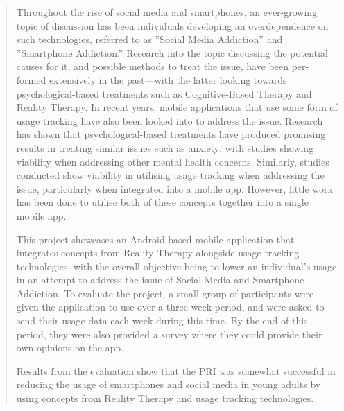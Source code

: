 \documentclass[12pt]{article}
\begin{document}
\begin{abstract}
Throughout the rise of social media and smartphones, an ever-growing topic of discussion has been individuals developing an overdependence on such technologies, referred to as ”Social Media 
Addiction” and ”Smartphone Addiction.” Research into the topic discussing the potential causes for it, and possible methods to treat the issue, have been per- formed extensively in the 
past—with the latter looking towards psychological-based treatments such as Cognitive-Based Therapy and Reality Therapy. In recent years, mobile applications that use some form of usage tracking 
have also been looked into to address the issue. Research has shown that psychological-based treatments have produced promising results in treating similar issues such as anxiety; with studies 
showing viability when addressing other mental health concerns. Similarly, studies conducted show viability in utilising usage tracking when addressing the issue, particularly when integrated 
into a mobile app. However, little work has been done to utilise both of these concepts together into a single mobile app.\newline


This project showcases an Android-based mobile application that integrates concepts from Reality Therapy alongside usage tracking technologies, with
the overall objective being to lower an individual's usage in an attempt to address the issue of Social Media and Smartphone Addiction. To evaluate
the project, a small group of participants were given the application to use over a three-week period, and were asked to send their usage data
each week during this time. By the end of this period, they were also provided a survey where they could provide their own opinions on the app.  \newline

Results from the evaluation show that the PRI was somewhat successful in reducing the usage of smartphones and social media in young adults by using
concepts from Reality Therapy and usage tracking technologies.

\end{abstract}
\end{document}
